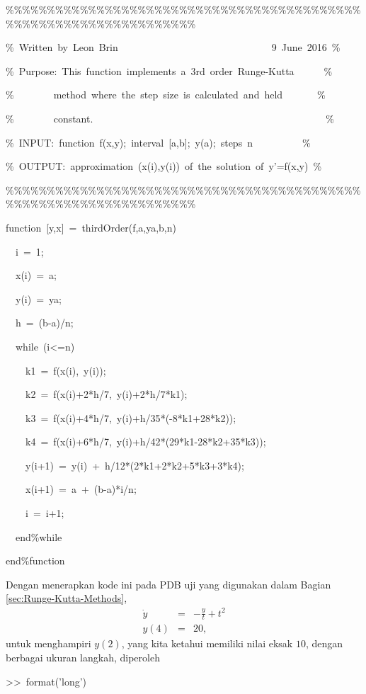 \begin{description}
\begin{lyxcode}
\%\%\%\%\%\%\%\%\%\%\%\%\%\%\%\%\%\%\%\%\%\%\%\%\%\%\%\%\%\%\%\%\%\%\%\%\%\%\%\%\%\%\%\%\%\%\%\%\%\%\%\%\%\%\%\%\%\%\%\%\%\%\%\%\%\%

\%~Written~by~Leon~Brin~~~~~~~~~~~~~~~~~~~~~~~~~~~~~~~9~June~2016~\%

\%~Purpose:~This~function~implements~a~3rd~order~Runge-Kutta~~~~~~\%

\%~~~~~~~~method~where~the~step~size~is~calculated~and~held~~~~~~~\%

\%~~~~~~~~constant.~~~~~~~~~~~~~~~~~~~~~~~~~~~~~~~~~~~~~~~~~~~~~~~\%

\%~INPUT:~function~f(x,y);~interval~{[}a,b{]};~y(a);~steps~n~~~~~~~~~~\%

\%~OUTPUT:~approximation~(x(i),y(i))~of~the~solution~of~y'=f(x,y)~\%

\%\%\%\%\%\%\%\%\%\%\%\%\%\%\%\%\%\%\%\%\%\%\%\%\%\%\%\%\%\%\%\%\%\%\%\%\%\%\%\%\%\%\%\%\%\%\%\%\%\%\%\%\%\%\%\%\%\%\%\%\%\%\%\%\%\%

function~{[}y,x{]}~=~thirdOrder(f,a,ya,b,n)

~~i~=~1;

~~x(i)~=~a;

~~y(i)~=~ya;

~~h~=~(b-a)/n;

~~while~(i<=n)

~~~~k1~=~f(x(i),~y(i));

~~~~k2~=~f(x(i)+2{*}h/7,~y(i)+2{*}h/7{*}k1);

~~~~k3~=~f(x(i)+4{*}h/7,~y(i)+h/35{*}(-8{*}k1+28{*}k2));

~~~~k4~=~f(x(i)+6{*}h/7,~y(i)+h/42{*}(29{*}k1-28{*}k2+35{*}k3));

~~~~y(i+1)~=~y(i)~+~h/12{*}(2{*}k1+2{*}k2+5{*}k3+3{*}k4);

~~~~x(i+1)~=~a~+~(b-a){*}i/n;

~~~~i~=~i+1;

~~end\%while

end\%function~
\end{lyxcode}
Dengan menerapkan kode ini pada PDB uji yang digunakan dalam Bagian
\ref{sec:Runge-Kutta-Methods},
\begin{eqnarray*}
\dot{y} & = & -\frac{y}{t}+t^{2}\\
y(4) & = & 20,
\end{eqnarray*}
untuk menghampiri $y(2)$, yang kita ketahui memiliki nilai eksak
$10$, dengan berbagai ukuran langkah, diperoleh
\begin{lyxcode}
>\textcompwordmark >~format('long')


\end{lyxcode}
\end{description}
